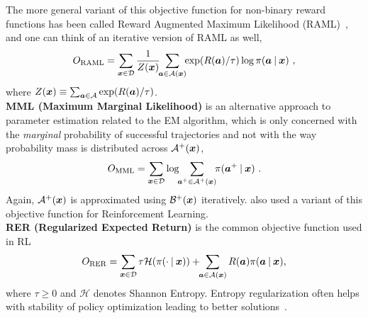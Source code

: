 The more general variant of this objective function for non-binary
reward functions has been called Reward Augmented Maximum Likelihood
(RAML)~\cite{norouzi2016reward}, and one can think of an iterative
version of RAML as well,
\begin{equation}
\displaystyle O_{\mathrm{RAML}} = 
\sum_{{\bm{x}} \in {\mathcal{D}}} \frac{1}{Z({\bm{x}})}
\!\! \sum_{{\bm{a}} \in \mathcal{A}({\bm{x}})} \!\!\exp(R({\bm{a}})/\tau) \log \pi({\bm{a}}\:\vert\:{\bm{x}})~,
\label{eq:raml}
\end{equation}
where $Z({\bm{x}}) \equiv \sum_{{\bm{a}} \in \mathcal{A}} \exp(R({\bm{a}})/\tau)$.\\[.4cm]
\triangle \textbf{MML (Maximum Marginal Likelihood)}
\cite{guu2017language,berant2013semantic} is an alternative approach to parameter
estimation related to the EM algorithm, which is only concerned with
the {\em marginal} probability of successful trajectories and not with
the way probability mass is distributed across $\mathcal{A}^+({\bm{x}})$,
\begin{equation}
\displaystyle O_{\mathrm{MML}} = \sum_{{\bm{x}} \in {\mathcal{D}}} \log
\!\! \sum_{{\bm{a}^+} \in \mathcal{A}^+({\bm{x}})} \!\! \pi({\bm{a}^+} \:\vert\: {\bm{x}})~.
\label{eq:mml}
\end{equation}
Again, $\mathcal{A}^+({\bm{x}})$ is approximated using $\mathcal{B}^+({\bm{x}})$
iteratively. \citet{dayan1997using} also used a variant of this
objective function for Reinforcement Learning.\\[.4cm]
\triangle \textbf{RER (Regularized Expected Return)} is the common objective
function used in RL
\begin{equation}
\displaystyle O_{\mathrm{RER}} = \sum_{{\bm{x}} \in {\mathcal{D}}} \tau {\mathcal H}(\pi(\cdot \:\vert\: {\bm{x}})) +\!\! \sum_{{\bm{a}} \in \mathcal{A}({\bm{x}})} R({\bm{a}}) \pi({\bm{a}} \:\vert\: {\bm{x}}),
\label{eq:rer}
\end{equation}
where $\tau \ge 0$ and $\mathcal H$ denotes Shannon Entropy.  Entropy
regularization often helps with stability of policy optimization
leading to better solutions~\cite{williams1991function}.

